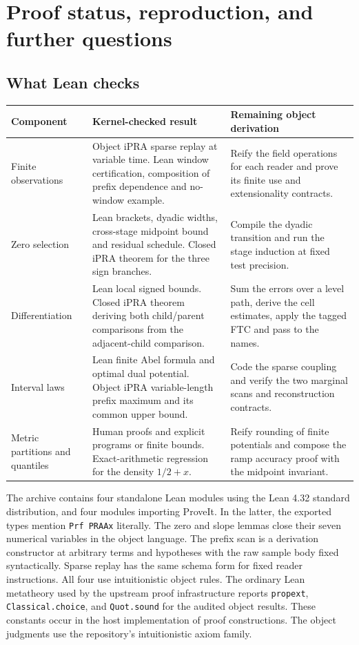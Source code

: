\section{Proof status, reproduction, and further questions}
\label{sec:replay}

\subsection{What Lean checks}

\noindent\begin{tabularx}{\linewidth}{@{}p{.23\linewidth}YY@{}}
\toprule
Component & Kernel-checked result & Remaining object derivation\\
\midrule
Finite observations & Object iPRA sparse replay at variable time. Lean window certification, composition of prefix dependence and no-window example. & Reify the field operations for each reader and prove its finite use and extensionality contracts.\\[3pt]
Zero selection & Lean brackets, dyadic widths, cross-stage midpoint bound and residual schedule. Closed iPRA theorem for the three sign branches. & Compile the dyadic transition and run the stage induction at fixed test precision.\\[3pt]
Differentiation & Lean local signed bounds. Closed iPRA theorem deriving both child/parent comparisons from the adjacent-child comparison. & Sum the errors over a level path, derive the cell estimates, apply the tagged FTC and pass to the names.\\[3pt]
Interval laws & Lean finite Abel formula and optimal dual potential. Object iPRA variable-length prefix maximum and its common upper bound. & Code the sparse coupling and verify the two marginal scans and reconstruction contracts.\\[3pt]
Metric partitions and quantiles & Human proofs and explicit programs or finite bounds. Exact-arithmetic regression for the density $1/2+x$. & Reify rounding of finite potentials and compose the ramp accuracy proof with the midpoint invariant.\\
\bottomrule
\end{tabularx}

The archive contains four standalone Lean modules using the Lean 4.32 standard
distribution, and four modules importing ProveIt. In the latter, the exported
types mention \texttt{Prf PRAAx} literally. The zero and slope lemmas close
their seven numerical variables in the object language. The prefix scan is
a derivation constructor at arbitrary terms and hypotheses with the raw sample
body fixed syntactically. Sparse replay has the same schema form for fixed reader instructions. All four use intuitionistic object rules. The
ordinary Lean metatheory used by the upstream proof infrastructure reports
\texttt{propext}, \texttt{Classical.choice}, and \texttt{Quot.sound} for the
audited object results. These constants occur in the host implementation of
proof constructions. The object judgments use the repository's intuitionistic axiom family.


